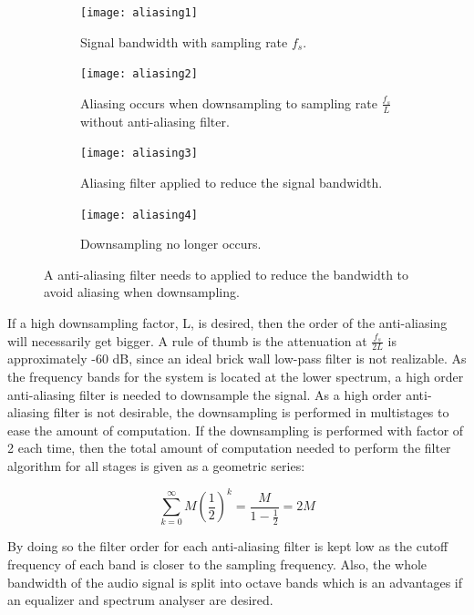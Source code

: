 \begin{figure}[H]
\centering
\begin{subfigure}[t]{0.44\textwidth}
\texttt{[image: aliasing1]}
	\caption{Signal bandwidth with sampling rate $f_s$.}
	\label{fig:aliasing1}
\end{subfigure}
\hspace{6mm} 
\begin{subfigure}[t]{0.47\textwidth}
\texttt{[image: aliasing2]}
	\caption{Aliasing occurs when downsampling to sampling rate $\frac{f_s}{L}$ without anti-aliasing filter.}
	\label{fig:aliasing2}
\end{subfigure}
\hspace{6mm}
\begin{subfigure}[b]{0.44\textwidth}
\texttt{[image: aliasing3]}
	\caption{Aliasing filter applied to reduce the signal bandwidth.}
	\label{fig:aliasing3}
\end{subfigure}
\hspace{6mm} 
\begin{subfigure}[b]{0.47\textwidth}
\texttt{[image: aliasing4]}
	\caption{Downsampling no longer occurs.}
	\label{fig:aliasing4}
\end{subfigure}
\caption{A anti-aliasing filter needs to applied to reduce the bandwidth to avoid aliasing when downsampling.}
\label{fig:aliasing}
\end{figure}

If a high downsampling factor, L, is desired, then the order of the anti-aliasing will necessarily get bigger. A rule of thumb is the attenuation at $\frac{f_s}{2L}$ is approximately -60 dB, since an ideal brick wall low-pass filter is not realizable. As the frequency bands for the system is located at the lower spectrum, a high order anti-aliasing filter is needed to downsample the signal. As a high order anti-aliasing filter is not desirable, the downsampling is performed in multistages to ease the amount of computation. If the downsampling is performed with factor of 2 each time, then the total amount of computation needed to perform the filter algorithm for all stages is given as a geometric series:

\begin{equation} \label{eq:z_transformation_example}
\sum_{k=0}^{\infty}M \left( \frac{1}{2} \right)^k  = \frac{M}{1-\frac{1}{2}} = 2M
\end{equation}

By doing so the filter order for each anti-aliasing filter is kept low as the cutoff frequency of each band is closer to the sampling frequency. Also, the whole bandwidth of the audio signal is split into octave bands which is an advantages if an equalizer and spectrum analyser are desired.




